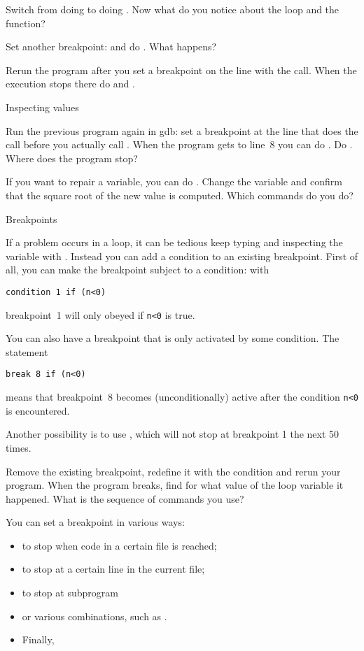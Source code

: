Switch from doing  to doing . Now what do you notice
about the loop and the function? 

Set another breakpoint:  and do . What happens?

Rerun the program after you set a breakpoint on the line with the
 call. When the execution stops there do  and
.

 {Inspecting values}

Run the previous program again in gdb: set a breakpoint at the line
that does the  call before you actually call . When the
program gets to line~8 you can do . Do . Where does
the program stop?

If you want to repair a variable, you can do . Change
the variable  and confirm that the square root of the new value
is computed. Which commands do you do?

 {Breakpoints}

If a problem occurs in a loop, it can be tedious keep typing 
and inspecting the variable with . Instead you can add a
condition to an existing breakpoint. First of all, you can make the breakpoint
subject to a condition: with
\begin{verbatim}
condition 1 if (n<0)
\end{verbatim}
breakpoint~1 will only obeyed if \texttt{n<0} is true.

You can also have a breakpoint that is only activated by some condition.
The statement
\begin{verbatim}
break 8 if (n<0)
\end{verbatim}
means that breakpoint~8 becomes (unconditionally) active after
the condition \texttt{n<0} is encountered.

Another possibility is to use , which will not stop at
breakpoint 1 the next 50 times.

Remove the existing breakpoint, redefine it with the condition 
and rerun your program. When the program breaks, find for what value
of the loop variable it happened. What is the sequence of commands you use?

You can set a breakpoint in various ways:
\begin{itemize}
\item {} to stop when code in a certain file is reached;
\item {} to stop at a certain line in the current file;
\item {} to stop at subprogram 
\item or various combinations, such as .
\item Finally, 
\end{itemize}

